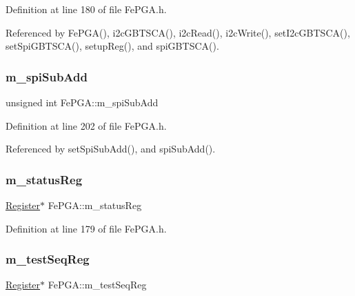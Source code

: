 Definition at line 180 of file Fe\+P\+G\+A.\+h.



Referenced by Fe\+P\+G\+A(), i2c\+G\+B\+T\+S\+C\+A(), i2c\+Read(), i2c\+Write(), set\+I2c\+G\+B\+T\+S\+C\+A(), set\+Spi\+G\+B\+T\+S\+C\+A(), setup\+Reg(), and spi\+G\+B\+T\+S\+C\+A().

\mbox{\label{classFePGA_a4f2f5d175aeb6dcaf497f81d2f075411}} 
\subsubsection{\texorpdfstring{m\+\_\+spi\+Sub\+Add}{m\_spiSubAdd}}
{\footnotesize\ttfamily unsigned int Fe\+P\+G\+A\+::m\+\_\+spi\+Sub\+Add\hspace{0.3cm}{\ttfamily [private]}}



Definition at line 202 of file Fe\+P\+G\+A.\+h.



Referenced by set\+Spi\+Sub\+Add(), and spi\+Sub\+Add().

\mbox{\label{classFePGA_ad8c66e956d4f4163ae4dcb966d3ebeed}} 
\subsubsection{\texorpdfstring{m\+\_\+status\+Reg}{m\_statusReg}}
{\footnotesize\ttfamily \hyperlink{classRegister}{Register}$\ast$ Fe\+P\+G\+A\+::m\+\_\+status\+Reg\hspace{0.3cm}{\ttfamily [private]}}



Definition at line 179 of file Fe\+P\+G\+A.\+h.

\mbox{\label{classFePGA_a67bc3c8f923b673100974fd86096393e}} 
\subsubsection{\texorpdfstring{m\+\_\+test\+Seq\+Reg}{m\_testSeqReg}}
{\footnotesize\ttfamily \hyperlink{classRegister}{Register}$\ast$ Fe\+P\+G\+A\+::m\+\_\+test\+Seq\+Reg\hspace{0.3cm}{\ttfamily [private]}}



